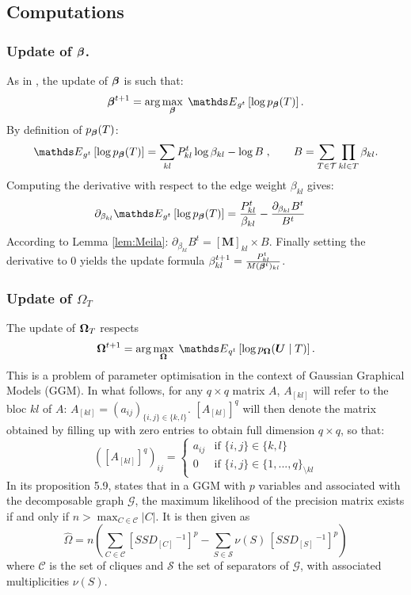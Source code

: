 
\subsection{Computations} \label{app:comput}
\subsubsection[Update of tree parameter vector]{Update of ${\boldsymbol{\beta}}$.} \label{up:beta}
As in \citet{MRA20}, the update of ${\boldsymbol{\beta}}$ is such that:
$$\betabf^{t+1}  = \arg\max_\betabf \; \Esp_{g^t} \left[ \log p_\betabf(T) \right].
$$
By definition of $p_{\boldsymbol{\beta}}(T)$:
$$\Esp_{g^t} \left[ \log p_\betabf(T) \right] = \sum_{kl} P^t_{kl} \log \beta_{kl} - \log B\;,
\qquad
B=\sum_{T\in \mathcal{T}}\prod_{kl\in T} \beta_{kl}.$$
Computing the derivative with respect to the edge weight $\beta_{kl}$ gives:
\begin{align*}
\partial_{\beta_{kl}}\Esp_{g^t} \left[ \log p_\betabf(T) \right] &=\frac{P_{kl}^t}{\beta_{kl}} - \frac{\partial_{\beta_{kl}} B^t }{B^t} 
\end{align*}
According to Lemma \ref{lem:Meila}: $\partial_{\beta_{kl}} B^t  = [\boldsymbol{M}]_{kl} \times B$. Finally setting the derivative to 0 yields the update formula $
\beta^{t+1}_{kl} 
= \frac{P^t_{kl}}{ M({\boldsymbol{\beta}}^t)_{kl}}$.

\subsubsection[Update of Gaussian tree precision matrix]{Update of $\Omega_T$} \label{up:omega}
The update of ${\boldsymbol{\Omega}}_T$ respects
$$\Omegabf^{t+1}  = \arg\max_\Omegabf \; \Esp_{q^t} \left[ \log p_{\Omegabf}(\Ubf \mid T) \right].$$
This is a problem of parameter optimisation in the context of Gaussian Graphical Models (GGM).
In what follows, for any $q\times q$  matrix $A$, $A_{[kl]}$ will refer to the bloc $kl$ of $A$: $A_{[kl]}=(a_{ij})_{\{i,j\}\in\{k,l\}}$.   $[A_{[kl]}]^q$ will then denote the matrix obtained by filling up with zero entries to obtain full dimension $q\times q$, so that:
$$([A_{[kl]}]^q )_{ij}=\left\{ \begin{array}{rl}
a_{ij} & \text{if } \{i,j\}\in\{k,l\}\\
0 &  \text{if } \{i,j\}\in\{1,..., q\}_{\setminus kl}
\end{array}\right.$$
In its proposition 5.9, \citet{Lau96} states that in a  GGM with $p$ variables and associated with the decomposable graph $\mathcal{G}$, the maximum likelihood of the precision matrix exists if and only if $n > \max_{C\in \mathcal{C}} |C|$. It is then given as 
$$\widehat{\Omega}=n\left(\sum_{C\in \mathcal{C}} [SSD_{[C]}\,^{-1}]^p - \sum_{S\in \mathcal{S}} \nu(S)\,[SSD_{[S]}\,^{-1}]^p \right)$$
where $\mathcal{C}$ is the set of cliques and $\mathcal{S}$ the set of separators of $\mathcal{G}$, with associated multiplicities $\nu(S)$.\\



